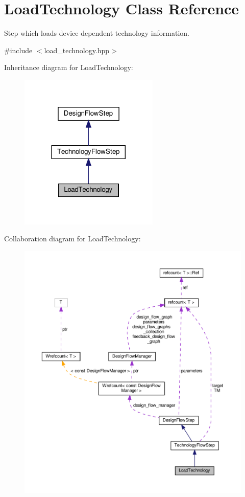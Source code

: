 \hypertarget{classLoadTechnology}{}\section{Load\+Technology Class Reference}
\label{classLoadTechnology}


Step which loads device dependent technology information.  




{\ttfamily \#include $<$load\+\_\+technology.\+hpp$>$}



Inheritance diagram for Load\+Technology\+:
\nopagebreak
\begin{figure}[H]
\begin{center}
\leavevmode
\includegraphics[width=188pt]{d9/d53/classLoadTechnology__inherit__graph}
\end{center}
\end{figure}


Collaboration diagram for Load\+Technology\+:
\nopagebreak
\begin{figure}[H]
\begin{center}
\leavevmode
\includegraphics[width=350pt]{d6/d4b/classLoadTechnology__coll__graph}
\end{center}
\end{figure}
